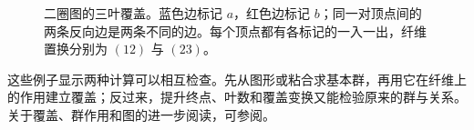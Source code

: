 \begin{figure}[htbp]
	\centering
	
	\caption{二圈图的三叶覆盖。蓝色边标记 \(a\)，红色边标记 \(b\)；同一对顶点间的两条反向边是两条不同的边。每个顶点都有各标记的一入一出，纤维置换分别为 \((12)\) 与 \((23)\)。}
	\label{g1:fig:three-sheet-graph}
\end{figure}

这些例子显示两种计算可以相互检查。先从图形或粘合求基本群，再用它在纤维上的作用建立覆盖；反过来，提升终点、叶数和覆盖变换又能检验原来的群与关系。关于覆盖、群作用和图的进一步阅读，可参阅\cite[第1.3节; 第1.A节]{Hatcher2002}。
